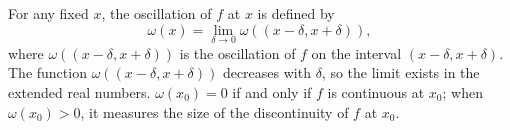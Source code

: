 For any fixed $x$, the oscillation of $f$ at $x$ is defined by
$$\omega(x) = \lim_{\delta \to 0} \omega((x - \delta, x + \delta)),$$
where $\omega((x - \delta, x + \delta))$ is the oscillation of $f$ on the interval $(x - \delta, x + \delta)$. The function $\omega((x - \delta, x + \delta))$ decreases with $\delta$, so the limit exists in the extended real numbers. $\omega(x_0) = 0$ if and only if $f$ is continuous at $x_0$; when $\omega(x_0) > 0$, it measures the size of the discontinuity of $f$ at $x_0$.
